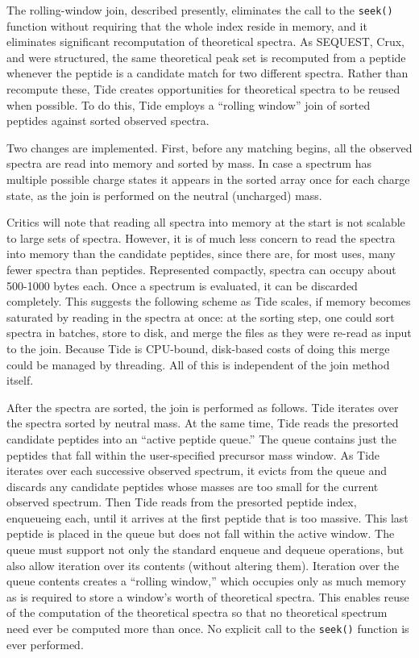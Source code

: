 The rolling-window join, described presently, eliminates the call to 
the {\tt seek()} function
without requiring that the whole index reside in memory, and it
eliminates significant recomputation of theoretical spectra. As
SEQUEST, Crux, and \tidezero were structured, the same theoretical
peak set is recomputed from a peptide whenever the peptide is a
candidate match for two different spectra. Rather than recompute
these, Tide creates opportunities for theoretical spectra to be reused
when possible.  To do this, Tide employs a ``rolling window'' join of
sorted peptides against sorted observed spectra.

Two changes are implemented. First, before any matching begins, all
the observed spectra are read into memory and sorted by mass.  In case
a spectrum has multiple possible charge states it appears in the
sorted array once for each charge state, as the join is performed on
the neutral (uncharged) mass.

Critics will note that reading all spectra into memory at the start is
not scalable to large sets of spectra. However, it is of much less
concern to read the spectra into memory than the candidate peptides,
since there are, for most uses, many fewer spectra than
peptides. Represented compactly, spectra can occupy about 500-1000
bytes each. Once a spectrum is evaluated, it can be discarded
completely. This suggests the following scheme as Tide scales, if
memory becomes saturated by reading in the spectra at once: at the
sorting step, one could sort spectra in batches, store to disk, and
merge the files as they were re-read as input to the join. Because Tide
is CPU-bound, disk-based costs of doing this merge could be managed by
threading. All of this is independent of the join method itself.

After the spectra are sorted, the join is performed as follows. Tide
iterates over the spectra sorted by neutral mass. At the same time,
Tide reads the presorted candidate peptides into an ``active peptide
queue.'' The queue contains just the peptides that fall within the
user-specified precursor mass window. As Tide iterates over each
successive observed spectrum, it evicts from the queue and discards
any candidate peptides whose masses are too small for the current observed
spectrum. Then Tide reads from the presorted peptide index, enqueueing
each, until it arrives at the first peptide that is too massive. This
last peptide is placed in the queue but does not fall within the
active window. The queue must support not only the standard enqueue
and dequeue operations, but also allow iteration over its contents
(without altering them). Iteration over the queue contents creates a
``rolling window,'' which occupies only as much memory as is required
to store a window's worth of theoretical spectra. This enables reuse
of the computation of the theoretical spectra so that no theoretical
spectrum need ever be computed more than once. No explicit call to the 
{\tt seek()} function
is ever performed.

